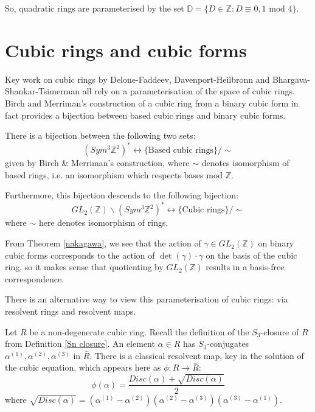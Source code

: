 \documentclass{report}
\begin{document}
So, quadratic rings are parameterised by the set $\mathbb{D} = \{D \in \mathbb{Z} : D \equiv 0,1 \text{ mod } 4 \}$.

\section{Cubic rings and cubic forms}

Key work on cubic rings by Delone-Faddeev, Davenport-Heilbronn and Bhargava-Shankar-Tsimerman all rely on a parameterisation of the space of cubic rings.  Birch and Merriman's construction of a cubic ring from a binary cubic form in fact provides a bijection between based cubic rings and binary cubic forms.

\begin{theorem}  \label{cubic rings}
There is a bijection between the following two sets:
\begin{equation}
(Sym^3 \mathbb{Z}^2)^* \leftrightarrow \{ \text{Based cubic rings} \} / \sim
\end{equation}
given by Birch \& Merriman's construction, where $\sim$ denotes isomorphism of based rings, i.e. an isomorphism which respects bases mod $\mathbb{Z}$.

Furthermore, this bijection descends to the following bijection:
\begin{equation}
GL_2(\mathbb{Z}) \backslash (Sym^3 \mathbb{Z}^2)^* \leftrightarrow \{ \text{Cubic rings} \} / \sim
\end{equation}
where $\sim$ here denotes isomorphism of rings.
\end{theorem}

From Theorem \ref{nakagawa}, we see that the action of $\gamma \in GL_2(\mathbb{Z})$ on binary cubic forms corresponds to the action of $\det(\gamma) \cdot \gamma$ on the basis of the cubic ring, so it makes sense that quotienting by $GL_2(\mathbb{Z})$ results in a basis-free correspondence.

There is an alternative way to view this parameterisation of cubic rings: via resolvent rings and resolvent maps.  

Let $R$ be a non-degenerate cubic ring.  Recall the definition of the $S_3$-closure of $R$ from Definition \ref{Sn closure}.  An element $\alpha \in R$ has $S_3$-conjugates $\alpha^{(1)}, \alpha^{(2)}, \alpha^{(3)}$ in $\bar{R}$.  There is a classical resolvent map, key in the solution of the cubic equation, which appears here as $\phi : R \to \bar{R}$:
\begin{equation}
\phi(\alpha) = \frac{ Disc(\alpha) + \sqrt{Disc(\alpha)}}{2}
\end{equation}
where $\sqrt{Disc(\alpha)} = (\alpha^{(1)} - \alpha^{(2)})(\alpha^{(2)} - \alpha^{(3)})(\alpha^{(3)} - \alpha^{(1)})$.
\end{document}
